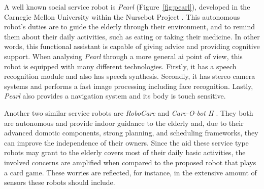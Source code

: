 A well known social service robot is \emph{Pearl} (Figure~\ref{fig:pearl}), developed in the Carnegie Mellon University within the Nursebot Project \cite{Pollack2002}.
This autonomous robot's duties are to guide the elderly through their environment, and to remind them about their daily activities, such as eating or taking their medicine.
In other words, this functional assistant is capable of giving advice and providing cognitive support.
When analysing \emph{Pearl} through a more general \gls{ai} point of view, this robot is equipped with many different technologies.
Firstly, it has a speech recognition module and also has speech synthesis.
Secondly, it has stereo camera systems and performs a fast image processing including face recognition.
Lastly, \emph{Pearl} also provides a navigation system and its body is touch sensitive.

Another two similar service robots are \emph{RoboCare} \cite{Bahadori} and \emph{Care-O-bot II} \cite{Graf2004}.
They both are autonomous and provide indoor guidance to the elderly and, due to their advanced domotic components, strong planning, and scheduling frameworks, they can improve the independence of their owners.
Since the aid these service type robots may grant to the elderly covers most of their daily basic activities, the involved concerns are amplified when compared to the proposed robot that plays a card game.
These worries are reflected, for instance, in the extensive amount of sensors these robots should include.

